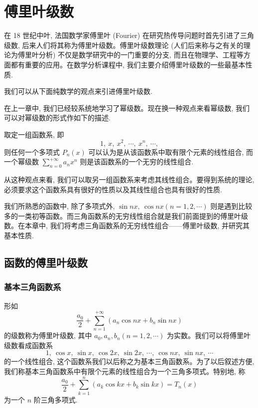 \setcounter{chapter}{11} %
\chapter{傅里叶级数}
\label{chap:ma-12}

在 18 世纪中叶, 法国数学家傅里叶 (Fourier) 在研究热传导问题时首先引进了三角级数, 后来人们将其称为傅里叶级数。傅里叶级数理论 (人们后来称与之有关的理论为傅里叶分析) 不仅是数学研究中的一门重要的分支, 而且在物理学、工程等方面都有重要的应用。在数学分析课程中, 我们主要介绍傅里叶级数的一些最基本性质.

我们可以从下面纯数学的观点来引进傅里叶级数.

在上一章中, 我们已经较系统地学习了幂级数。现在换一种观点来看幂级数, 我们可以对幂级数的形式作如下的描述.

取定一组函数系, 即
\[
  1,\ x,\ x^2,\ \cdots,\ x^n,\ \cdots,
\]
则任何一个多项式 $P_n(x)$ 可以认为是从该函数系中取有限个元素的线性组合, 而一个幂级数 $\sum\limits_{n=0}^{+\infty}a_nx^n$ 则是该函数系的一个无穷的线性组合.

从这种观点来看, 我们可以取另一组函数系来考虑其线性组合。要得到系统的理论, 必须要求这个函数系具有很好的性质以及其线性组合也具有很好的性质.

我们所熟悉的函数中, 除了多项式外, $\sin nx,\ \cos nx(n=1,2,\cdots)$ 则是遇到比较多的一类初等函数。而三角函数系的无穷线性组合就是我们前面提到的傅里叶级数。在本章中, 我们将考虑三角函数系的无穷线性组合——傅里叶级数, 并研究其基本性质.

\section{函数的傅里叶级数}
\label{sec:ma-12-1}

\subsection{基本三角函数系}
\label{subsec:ma-12-1-1}

形如
\[
  \frac{a_0}{2}+\sum_{n=1}^{+\infty}(a_n\cos nx+b_n\sin nx)
\]
的级数称为傅里叶级数, 其中 $a_0,a_n,b_n(n=1,2,\cdots)$ 为实数。我们可以将傅里叶级数看成函数系
\begin{equation}
  1,\ \cos x,\ \sin x,\ \cos 2x,\ \sin 2x,\ \cdots,\ \cos nx,\ \sin nx,\ \cdots
  \label{eq:ma-12-1-1}
\end{equation}
的一个线性组合, 这个函数系我们以后称之为基本三角函数系。为了以后叙述方便, 我们称基本三角函数系中有限个元素的线性组合为一个三角多项式。特别地, 称
\[
  \frac{a_0}{2}+\sum_{k=1}^n(a_k\cos kx+b_k\sin kx)=T_n(x)
\]
为一个 $n$ 阶三角多项式.

